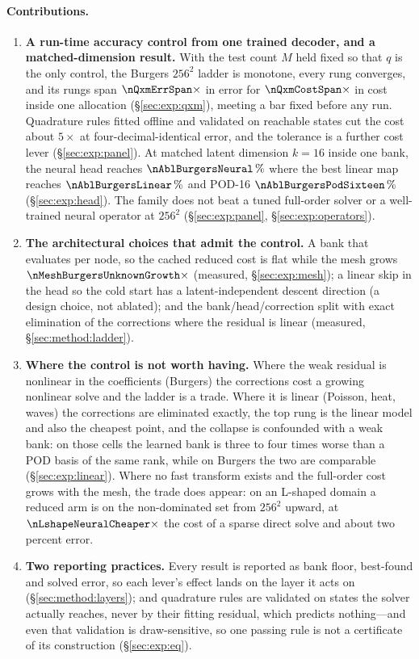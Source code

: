 \paragraph{Contributions.}
\begin{enumerate}
\item \textbf{A run-time accuracy control from one trained decoder, and a
  matched-dimension result.} With the test count $M$ held fixed so that $q$ is
  the only control, the Burgers $256^2$ ladder is monotone, every rung
  converges, and its rungs span $\nQxmErrSpan\times$ in error for
  $\nQxmCostSpan\times$ in cost inside one allocation (\S\ref{sec:exp:qxm}),
  meeting a bar fixed before any run. Quadrature rules fitted offline and
  validated on reachable states cut the cost about $5\times$ at
  four-decimal-identical error, and the tolerance is a
  further cost lever (\S\ref{sec:exp:panel}). At matched latent dimension
  $k=16$ inside one bank, the neural head reaches $\nAblBurgersNeural\,\%$
  where the best linear map reaches $\nAblBurgersLinear\,\%$ and POD-16
  $\nAblBurgersPodSixteen\,\%$ (\S\ref{sec:exp:head}). The family does not beat
  a tuned full-order solver or a well-trained neural operator at $256^2$
  (\S\ref{sec:exp:panel}, \S\ref{sec:exp:operators}).
\item \textbf{The architectural choices that admit the control.} A bank that
  evaluates per node, so the cached reduced cost is flat while the mesh grows
  $\nMeshBurgersUnknownGrowth\times$ (measured, \S\ref{sec:exp:mesh}); a linear
  skip in the head so the cold start has a latent-independent descent direction
  (a design choice, not ablated); and the bank/head/correction split with exact
  elimination of the corrections where the residual is linear (measured,
  \S\ref{sec:method:ladder}).
\item \textbf{Where the control is not worth having.} Where the weak residual
  is nonlinear in the coefficients (Burgers) the corrections cost a growing
  nonlinear solve and the ladder is a trade. Where it is linear (Poisson, heat,
  waves) the corrections are eliminated exactly, the top rung is the linear
  model and also the cheapest point, and the collapse is confounded with a weak
  bank: on those cells the learned bank is three to four times worse than a POD
  basis of the same rank, while on Burgers the two are comparable
  (\S\ref{sec:exp:linear}). Where no fast transform exists and the full-order
  cost grows with the mesh, the trade does appear: on an L-shaped domain a
  reduced arm is on the non-dominated set from $256^2$ upward, at
  $\nLshapeNeuralCheaper\times$ the cost of a sparse direct solve and about two
  percent error.
\item \textbf{Two reporting practices.} Every result is reported as bank floor,
  best-found and solved error, so each lever's effect lands on the layer it acts
  on (\S\ref{sec:method:layers}); and quadrature rules are validated on states
  the solver actually reaches, never by their fitting residual, which predicts
  nothing---and even that validation is draw-sensitive, so one passing rule is
  not a certificate of its construction (\S\ref{sec:exp:eq}).
\end{enumerate}

